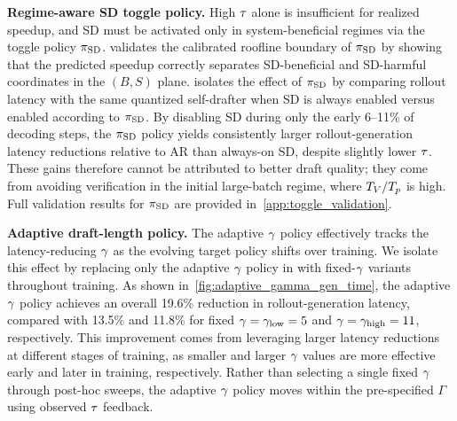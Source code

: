\textbf{Regime-aware SD toggle policy.}
High $\tau$ alone is insufficient for realized speedup, and SD must be activated only in system-beneficial regimes via the toggle policy $\pi_{\mathrm{SD}}$.
 validates the calibrated roofline boundary of $\pi_{\mathrm{SD}}$ by showing that the predicted speedup correctly separates SD-beneficial and SD-harmful coordinates in the $(B,S)$ plane.
 isolates the effect of $\pi_{\mathrm{SD}}$ by comparing rollout latency with the same quantized self-drafter when SD is always enabled versus enabled according to $\pi_{\mathrm{SD}}$.
By disabling SD during only the early 6--11\% of decoding steps, the $\pi_{\mathrm{SD}}$ policy yields consistently larger rollout-generation latency reductions relative to AR than always-on SD, despite slightly lower $\tau$.
These gains therefore cannot be attributed to better draft quality; they come from avoiding verification in the initial large-batch regime, where $T_V/T_p$ is high.
Full validation results for $\pi_{\mathrm{SD}}$ are provided in~\cref{app:toggle_validation}.


\textbf{Adaptive draft-length policy.}
The adaptive $\gamma$ policy effectively tracks the latency-reducing $\gamma$ as the evolving target policy shifts over training.
We isolate this effect by replacing only the adaptive $\gamma$ policy in \methodtitle{} with fixed-$\gamma$ variants throughout training.
As shown in~\cref{fig:adaptive_gamma_gen_time}, the adaptive $\gamma$ policy achieves an overall 19.6\% reduction in rollout-generation latency, compared with 13.5\% and 11.8\% for fixed $\gamma{}=\gamma_{\mathrm{low}}=5$ and $\gamma{}=\gamma_{\mathrm{high}}=11$, respectively.
This improvement comes from leveraging larger latency reductions at different stages of training, as smaller and larger $\gamma$ values are more effective early and later in training, respectively.
Rather than selecting a single fixed $\gamma{}$ through post-hoc sweeps, the adaptive $\gamma$ policy moves within the pre-specified $\Gamma$ using observed $\tau$ feedback.

